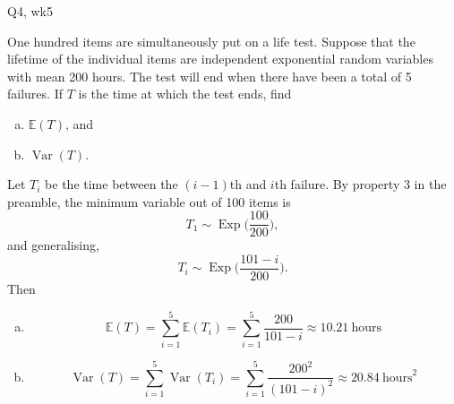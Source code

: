 
\begin{problem}{Q4, wk5}{}


    One hundred items are simultaneously put on a life test. Suppose that the lifetime of the individual items are independent exponential random variables with mean 200 hours. The test will end when there have been a total of 5 failures. If $T$ is the time at which the test ends, find
    \begin{enumerate}[a)]
        \item $\mathbb{E}(T)$, and
        \item $\operatorname{Var}(T)$.
    \end{enumerate}

    \tcblower

    Let $T_i$ be the time between the $(i -1)$th and $i$th failure. By property 3 in the preamble, the minimum variable out of 100 items is
        $$ T_1 \sim \operatorname{Exp} \biggl( \frac{100}{200} \biggr) , $$
    and generalising,
        $$ T_i \sim \operatorname{Exp} \biggl( \frac{101 - i}{200} \biggr) . $$
    Then
        \begin{enumerate}[a)]
            \item
                $$ \mathbb{E}(T) = \sum_{i = 1}^5 \mathbb{E}(T_i)
                    = \sum_{i = 1}^5 \frac{200}{101 - i}
                    \approx 10.21 \ \text{hours} $$
            \item 
                $$ \operatorname{Var}(T) = \sum_{i = 1}^5 \operatorname{Var}(T_i)
                    = \sum_{i = 1}^5 \frac{200^2}{(101 - i)^2}
                    \approx 20.84 \ \text{hours}^2 $$
    \end{enumerate}

\end{problem}

